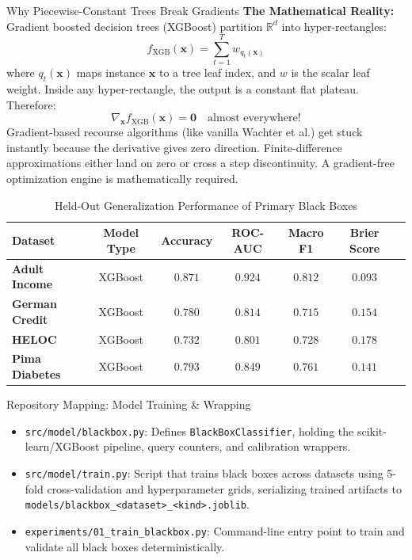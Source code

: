 \documentclass[11pt,a4paper]{article}
\begin{document}
\begin{childbranch}{Why Piecewise-Constant Trees Break Gradients}
\textbf{The Mathematical Reality:}
Gradient boosted decision trees (XGBoost) partition $\mathbb{R}^d$ into hyper-rectangles:
\begin{equation}
f_{\text{XGB}}(\mathbf{x}) = \sum_{t=1}^T w_{q_t(\mathbf{x})}
\end{equation}
where $q_t(\mathbf{x})$ maps instance $\mathbf{x}$ to a tree leaf index, and $w$ is the scalar leaf weight. 
Inside any hyper-rectangle, the output is a constant flat plateau. Therefore:
\begin{equation}
\nabla_{\mathbf{x}} f_{\text{XGB}}(\mathbf{x}) = \mathbf{0} \quad \text{almost everywhere!}
\end{equation}
Gradient-based recourse algorithms (like vanilla Wachter et al.) get stuck instantly because the derivative gives zero direction. Finite-difference approximations either land on zero or cross a step discontinuity. A gradient-free optimization engine is mathematically required.
\end{childbranch}

\begin{table}[htbp]
\centering
\caption{Held-Out Generalization Performance of Primary Black Boxes}
\label{tab:blackbox_perf}
\small
\begin{tabular}{lcccccc}
\toprule
\textbf{Dataset} & \textbf{Model Type} & \textbf{Accuracy} & \textbf{ROC-AUC} & \textbf{Macro F1} & \textbf{Brier Score} \\
\midrule
\textbf{Adult Income} & XGBoost & $0.871$ & $0.924$ & $0.812$ & $0.093$ \\
\textbf{German Credit} & XGBoost & $0.780$ & $0.814$ & $0.715$ & $0.154$ \\
\textbf{HELOC} & XGBoost & $0.732$ & $0.801$ & $0.728$ & $0.178$ \\
\textbf{Pima Diabetes} & XGBoost & $0.793$ & $0.849$ & $0.761$ & $0.141$ \\
\bottomrule
\end{tabular}
\end{table}

\begin{codeanatomy}{Repository Mapping: Model Training \& Wrapping}
\begin{itemize}[leftmargin=1.2em]
    \item \texttt{src/model/blackbox.py}: Defines \texttt{BlackBoxClassifier}, holding the scikit-learn/XGBoost pipeline, query counters, and calibration wrappers.
    \item \texttt{src/model/train.py}: Script that trains black boxes across datasets using 5-fold cross-validation and hyperparameter grids, serializing trained artifacts to \texttt{models/blackbox\_<dataset>\_<kind>.joblib}.
    \item \texttt{experiments/01\_train\_blackbox.py}: Command-line entry point to train and validate all black boxes deterministically.
\end{itemize}
\end{codeanatomy}
\end{document}
